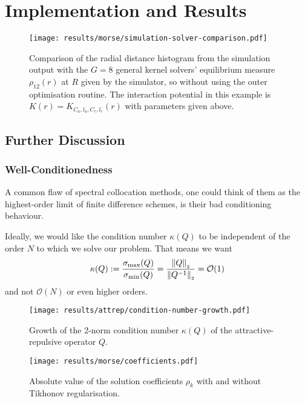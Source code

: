 \chapter{Implementation and Results}
\label{chap:implementation-and-results}

% 

\begin{figure}[H]
  \centering
  \label{fig:simulation-solver-comparison}
  \texttt{[image: results/morse/simulation-solver-comparison.pdf]}
  \caption[Comparison of histogram and spectral method solution]{Comparison of the radial distance histogram from the simulation output with the $G = 8$ general kernel solvers' equilibrium measure $\rho_{12}(r)$ at $R$ given by the simulator, so without using the outer optimisation routine. The interaction potential in this example is $K(r) = K_{C_a, l_a, C_r, l_r}(r)$ with parameters given above.}
\end{figure}

\section{Further Discussion}
\subsection{Well-Conditionedness}
A common flaw of spectral collocation methods, one could think of them as the highest-order limit of finite difference schemes, is their bad conditioning behaviour.

Ideally, we would like the condition number $\kappa(Q)$ to be independent of the order $N$ to which we solve our problem. That means we want
$$\kappa(Q) := \frac{\sigma_{\rm max}(Q)}{\sigma_{\rm min}(Q)} = \frac{\left\lVert Q\right\rVert_{\scriptscriptstyle 2}}{\left\lVert Q^{-1}\right\rVert_{\scriptscriptstyle 2}} = \mathcal{O}(1)$$
and not $\mathcal{O}(N)$ or even higher orders.

\begin{figure}[H]
  \centering
  \label{fig:condition-number-growth}
  \texttt{[image: results/attrep/condition-number-growth.pdf]}
  \caption[Growth of the condition number]{Growth of the 2-norm condition number $\kappa(Q)$ of the attractive-repulsive operator $Q$.}
\end{figure}

\begin{figure}[H]
  \centering
  \label{fig:coefficients}
  \texttt{[image: results/morse/coefficients.pdf]}
  \caption[Absolute value of the coefficients with and without regularisation]{Absolute value of the solution coefficients $\rho_k$ with and without Tikhonov regularisation.}
\end{figure}

